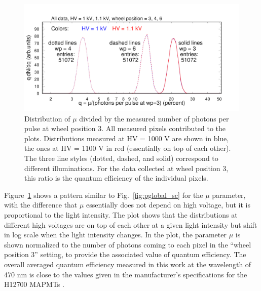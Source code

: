 \begin{figure}[h!]
	\centering
	\includegraphics[width=0.98\linewidth,trim=0 12 50 35,clip]{figures/pglobal_qe_all.pdf}
	\caption{Distribution of $\mu$ divided by the measured number of photons per pulse at wheel position 3. All measured pixels contributed to the plots. Distributions measured at HV = 1000 V are shown in blue, the ones at HV = 1100 V in red (essentially on top of each other). The three line styles (dotted, dashed, and solid) correspond to different illuminations. For the data collected at wheel position 3, this ratio is the quantum efficiency of the individual pixels.}
	\label{fig:pglobal_qe_all}
\end{figure}
Figure~\ref{fig:pglobal_qe_all} shows a pattern similar to Fig.~\ref{fig:pglobal_sc} for the $\mu$ parameter, with the difference that $\mu$ essentially does not depend on high voltage, but it is proportional to the light intensity. The plot shows that the distributions at different high voltages are on top of each other at a given light intensity but shift in log scale when the light intensity changes. In the plot, the parameter $\mu$ is shown normalized to the number of photons coming to each pixel in the ``wheel position 3'' setting, to provide the associated value of quantum efficiency. The overall averaged quantum efficiency measured in this work at the wavelength of 470 nm is close to the values given in the manufacturer's specifications for the H12700 MAPMTs \cite{H12700}.


